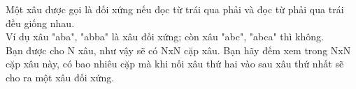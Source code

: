 Một xâu được gọi là đối xứng nếu đọc từ trái qua phải và đọc từ phải qua trái đều giống nhau.   
\\   Ví dụ xâu "aba", "abba" là xâu đối xứng; còn xâu "abc", "abca" thì không.   
\\   Bạn được cho N xâu, như vậy sẽ có NxN cặp xâu. Bạn hãy đếm xem trong NxN cặp xâu này, có bao nhiêu cặp mà khi nối xâu thứ hai vào sau xâu thứ nhất sẽ cho ra một xâu đối xứng.  

\